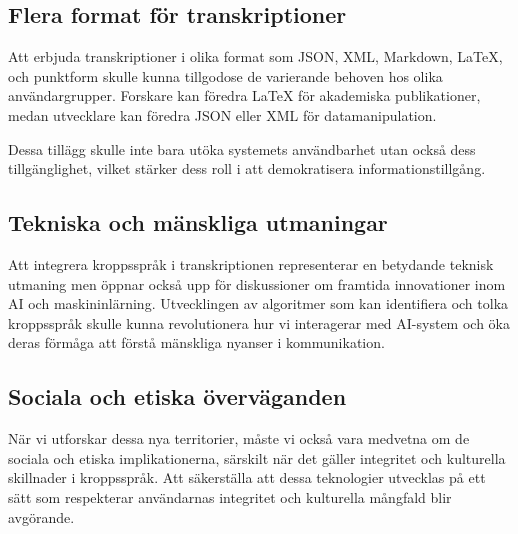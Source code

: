 \subsection{Flera format för transkriptioner}
Att erbjuda transkriptioner i olika format
som JSON, XML, Markdown, LaTeX, och punktform skulle kunna tillgodose de
varierande behoven hos olika användargrupper. Forskare kan föredra LaTeX för
akademiska publikationer, medan utvecklare kan föredra JSON eller XML för
datamanipulation.

Dessa tillägg skulle inte bara utöka systemets användbarhet utan också dess
tillgänglighet, vilket stärker dess roll i att demokratisera
informationstillgång.

\subsection{Tekniska och mänskliga utmaningar}
Att integrera kroppsspråk i transkriptionen representerar en betydande teknisk
utmaning men öppnar också upp för diskussioner om framtida innovationer inom
AI och maskininlärning. Utvecklingen av algoritmer som kan identifiera och
tolka kroppsspråk skulle kunna revolutionera hur vi interagerar med AI-system
och öka deras förmåga att förstå mänskliga nyanser i kommunikation.

\subsection{Sociala och etiska överväganden}
När vi utforskar dessa nya territorier, måste vi också vara medvetna om de
sociala och etiska implikationerna, särskilt när det gäller integritet och
kulturella skillnader i kroppsspråk. Att säkerställa att dessa teknologier
utvecklas på ett sätt som respekterar användarnas integritet och kulturella
mångfald blir avgörande.
